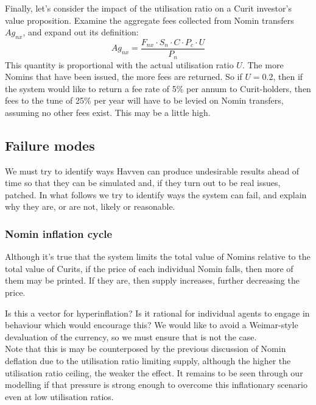 \noindent Finally, let's consider the impact of the utilisation ratio on a Curit investor's value proposition. Examine the aggregate fees collected from Nomin transfers \(Ag_{nx}\), and expand out its definition:
\[Ag_{nx} = \frac{F_{nx} \cdot S_n \cdot C \cdot P_c \cdot U}{P_n}\]
This quantity is proportional with the actual utilisation ratio \(U\). The more Nomins that have been issued, the more fees are returned. So if \(U = 0.2\), then if the system would like to return a fee rate of 5\% per annum to Curit-holders, then fees to the tune of 25\% per year will have to be levied on Nomin transfers, assuming no other fees exist. This may be a little high.

\pagebreak
\subsection{Failure modes}

We must try to identify ways Havven can produce undesirable results ahead of time so that they can be simulated and, if they turn out to be real issues, patched. In what follows we try to identify ways the system can fail, and explain why they are, or are not, likely or reasonable. \\

\subsubsection{Nomin inflation cycle}

Although it's true that the system limits the total value of Nomins relative to the total value of Curits, if the price of each individual Nomin falls, then more of them may be printed. If they are, then supply increases, further decreasing the price.

\noindent Is this a vector for hyperinflation? Is it rational for individual agents to engage in behaviour which would encourage this? We would like to avoid a Weimar-style devaluation of the currency, so we must ensure that is not
the case. \\

\noindent Note that this is may be counterposed by the previous discussion of Nomin deflation due to the utilisation ratio limiting supply, although the higher the utilisation ratio ceiling, the weaker the effect. It remains to be seen through our modelling if that pressure is strong enough to overcome this inflationary scenario even at low utilisation ratios. \\


